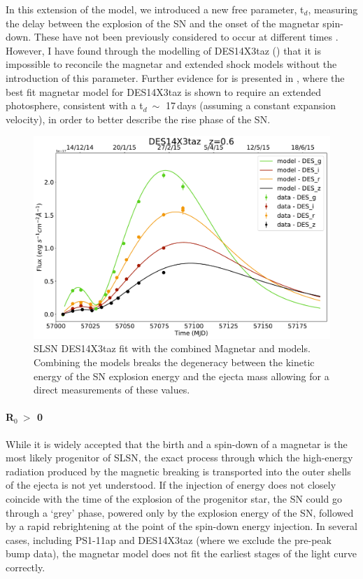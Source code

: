 In this extension of the model, we introduced a new free parameter, t$_d$, measuring the delay between the explosion of the SN and the onset of the magnetar spin-down. These have not been previously considered to occur at different times \citep{Nicholl2015b}. However, I have found through the modelling of DES14X3taz () that it is impossible to reconcile the magnetar and extended shock models without the introduction of this parameter. Further evidence for is presented in , where the best fit magnetar model for DES14X3taz is shown to require an extended photosphere, consistent with a t$_d ~\sim$ 17\,days (assuming a constant expansion velocity), in order to better describe the rise phase of the SN.

\begin{figure}
  \centering
  \includegraphics[width=\textwidth]{Figures/Chapter3/DES14X3taz}
  \caption{SLSN DES14X3taz fit with the combined Magnetar and \citet{Piro2015} models. Combining the models breaks the degeneracy between the kinetic energy of the SN explosion energy and the ejecta mass allowing for a direct measurements of these values.}
  \label{fig:PiroMagnetar}
\end{figure}

\paragraph{R$_0~>$ 0}
\label{par:R0nonzero}
While it is widely accepted that the birth and a spin-down of a magnetar is the most likely progenitor of SLSN, the exact process through which the high-energy radiation produced by the magnetic breaking is transported into the outer shells of the ejecta is not yet understood. If the injection of energy does not closely coincide with the time of the explosion of the progenitor star, the SN could go through a `grey' phase, powered only by the explosion energy of the SN, followed by a rapid rebrightening at the point of the spin-down energy injection. In several cases, including PS1-11ap and DES14X3taz (where we exclude the pre-peak bump data), the magnetar model does not fit the earliest stages of the light curve correctly.

